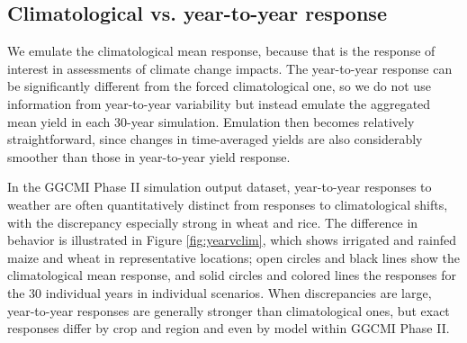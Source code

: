 \documentclass[gmdd]{copernicus} %
\begin{document}
\subsection{Climatological vs. year-to-year response}

We emulate the climatological mean response, because that is the response of interest in assessments of climate change impacts. 
The year-to-year response can be significantly different from the forced climatological one, so we do not use information from year-to-year variability but instead emulate the aggregated mean yield in each 30-year simulation. 
Emulation then becomes relatively straightforward, since changes in time-averaged yields are also considerably smoother than those in year-to-year yield response.

In the GGCMI Phase II simulation output dataset, year-to-year responses to weather are often quantitatively distinct from responses to climatological shifts, with the discrepancy especially strong in wheat and rice. 
The difference in behavior is illustrated in Figure \ref{fig:yearvclim}, which shows irrigated and rainfed maize and wheat in representative locations; open circles and black lines show the climatological mean response, and solid circles and colored lines the responses for the 30 individual years in individual scenarios.
When discrepancies are large, year-to-year responses are generally stronger than climatological ones, but exact responses differ by crop and region and even by model within GGCMI Phase II. 
\end{document}
